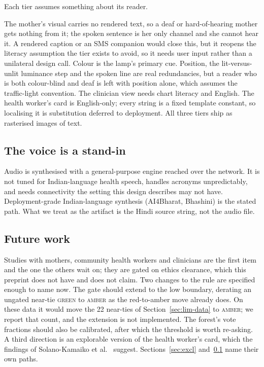 Each tier assumes something about its reader.

The mother's visual carries no rendered text, so a deaf or hard-of-hearing
mother gets nothing from it; the spoken sentence is her only channel and she
cannot hear it. A rendered caption or an SMS companion would close this, but
it reopens the literacy assumption the tier exists to avoid, so it needs user
input rather than a unilateral design call. Colour is the lamp's primary cue.
Position, the lit-versus-unlit luminance step and the spoken line are real
redundancies, but a reader who is both colour-blind and deaf is left with
position alone, which assumes the traffic-light convention. The clinician view
needs chart literacy and English. The health worker's card is English-only;
every string is a fixed template constant, so localising it is substitution
deferred to deployment. All three tiers ship as rasterised images of text.

\subsection{The voice is a stand-in}
\label{sec:voice}

Audio is synthesised with a general-purpose engine reached over the network.
It is not tuned for Indian-language health speech, handles acronyms
unpredictably, and needs connectivity the setting this design describes may
not have. Deployment-grade Indian-language synthesis (AI4Bharat, Bhashini) is
the stated path. What we treat as the artifact is the Hindi source string, not
the audio file.

\subsection{Future work}
\label{sec:future}

Studies with mothers, community health workers and clinicians are the first
item and the one the others wait on; they are gated on ethics clearance, which
this preprint does not have and does not claim. Two changes to the rule
are specified enough to name now. The gate should extend to the low boundary,
derating an ungated near-tie \textsc{green} to \textsc{amber} as the
red-to-amber move already does. On these data it would move the 22 near-ties
of Section~\ref{sec:lim-data} to \textsc{amber}; we report that count, and the
extension is not implemented. The forest's vote fractions should also be
calibrated, after which the threshold is worth re-asking. A third direction is
an explorable version of the health worker's card, which the findings of
Solano-Kamaiko et al.~\citep{solanokamaiko2024explorable} suggest.
Sections~\ref{sec:excl} and~\ref{sec:voice} name their own paths.
